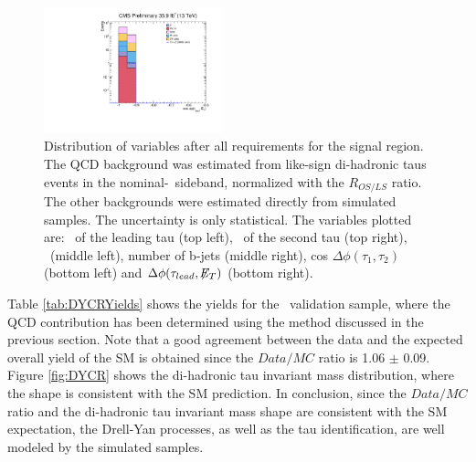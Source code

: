 \begin{figure}[H]
\begin{center}
 \includegraphics[clip,width=0.46\textwidth]{figuras/Chapter5/SR_Plots/cosTauMET.pdf} \hfill
 \end{center}
 \caption{Distribution of variables after all requirements for the signal region. The QCD 
 background was estimated from like-sign di-hadronic taus events in the 
 nominal-\MET~sideband, normalized with the $R_{OS/LS}$ ratio. The other backgrounds were estimated 
 directly from simulated samples. The uncertainty is only statistical. The variables plotted are:
 \pt~of the leading tau (top left),  \pt~of the second tau (top right), \MET~(middle left), number of b-jets (middle right), 
 cos $\Delta \phi (\tau_{1},\tau_{2})$ (bottom left) and $\Delta \phi (\tau_{lead}, \not\!\!E_T)$ (bottom right).}
\label{fig:SignalRegionPlots}
 \end{figure}


\noindent Table \ref{tab:DYCRYields} shows the yields for the \Ztotauh~validation 
sample, where the QCD contribution has been determined using the method 
discussed in the previous section. Note that a good 
agreement between the data and the expected overall yield of 
the SM  is obtained since the $Data/MC$ ratio 
is 1.06 $\pm$ 0.09. Figure \ref{fig:DYCR} shows the di-hadronic tau 
invariant mass distribution, where the shape is consistent
with the SM prediction. In conclusion, since the $Data/MC$ ratio and 
the di-hadronic tau invariant mass shape are consistent with 
the SM expectation, the Drell-Yan processes, as well as the tau identification, 
are well modeled by the simulated samples.


